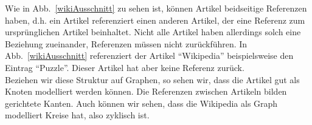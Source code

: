 \documentclass[12pt, a4paper]{article}
\begin{document}
Wie in Abb.~\ref{wikiAusschnitt} zu sehen ist, können Artikel beidseitige Referenzen haben, d.h.  ein Artikel referenziert einen anderen Artikel, der eine Referenz zum ursprünglichen Artikel beinhaltet. Nicht alle Artikel haben allerdings solch eine Beziehung zueinander, Referenzen müssen nicht zurückführen. In Abb.~\ref{wikiAusschnitt} referenziert der Artikel "`Wikipedia"' beispielsweise den Eintrag "`Puzzle"'. Dieser Artikel hat aber keine Referenz zurück.\\

Beziehen wir diese Struktur auf Graphen, so sehen wir, dass die Artikel gut als Knoten modelliert werden können. Die Referenzen zwischen Artikeln bilden gerichtete Kanten. Auch können wir sehen, dass die Wikipedia als Graph modelliert Kreise hat, also zyklisch ist.\\
\end{document}
